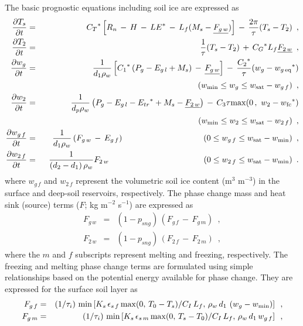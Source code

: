 The basic prognostic equations
including soil ice are expressed as
%
\begin{eqnarray}
\frac{\partial T_s}{\partial t} &=&
{C_T}^\ast \left[ R_n \,-\, H \,-\, {LE}^\ast \,-\,
L_f(M_s-{\underline{F_{g\,w}}})\right] \,-\,
\frac{2\pi}{\tau}(T_s-T_2)
\,\,\,, \\
%
\frac{\partial T_2}{\partial t} &=&
\frac{1}{\tau}(T_s-T_2)
\,+\,{C_G}^\ast L_f {\underline{F_{2\,w}}}
\,\,\,, \\
%
\frac{\partial w_g}{\partial t} &=&
\frac{1}{ d_1\rho_w} \left[ {C_1}^\ast\left(P_g-E_{g\,l}+M_s \right)
\,-\, {\underline{F_{g\,w}}} \right]
\,-\, \frac{{C_2}^\ast}{\tau}(w_g-{w_{g\,{\rm eq}}}^\ast) \\
& & \hskip2.6in
(w_{{\rm min}} \leq w_g \leq w_{\rm sat}-w_{g\,f})
\,\,\,, \\
%
\frac{\partial w_2}{\partial t} &=&
\frac{1}{ d_p\rho_w}
\left(P_g-{E_{g\,l}}-{E_{tr}}^\ast+M_s-
{\underline{F_{2\,w}}} \right) \,-\,{C_3}{\tau}{\rm max}
(0\,,\,\,w_2-{w_{\rm fc}}^\ast) \\
& & \hskip2.6in
(w_{{\rm min}}\leq w_2 \leq w_{\rm sat}-w_{2\,f})
\,\,\,, \\
%
\frac{\partial w_{g\,f}}{\partial t} &=&
\frac{1}{ d_1 \rho_w} \left(
F_{g\,w} \,-\, E_{g\,f} \right)
\hskip1.35in
(0 \leq w_{g\,f}\leq w_{\rm sat}-w_{{\rm min}} )
\,\,\,, \\
%
\frac{\partial w_{2\,f}}{\partial t} &=&
\frac{1}{ \left(d_2-d_1\right)\rho_w} F_{2\,w}
\hskip1.6in
(0 \leq w_{2\,f}\leq w_{\rm sat}-w_{{\rm min}} )
\,\,\,.
\end{eqnarray}
%
where $w_{g\,f}$ and $w_{2\,f}$ represent the volumetric soil ice content
(m$^3$ m$^{-3}$) in the surface and deep-soil reservoirs, respectively.
The phase change mass and heat sink (source) terms ($F$; kg m$^{-2}$ s$^{-1}$)
are expressed as
%
\begin{eqnarray}
F_{g\,w} &=& \left(1-p_{sng}\right)\,\left( F_{g\,f}
\,-\, F_{g\,m}\right)\,\,\,, \\
%
F_{2\,w} &=& \left(1-p_{sng}\right)\,\left( F_{2\,f}
\,-\, F_{2\,m}\right)\,\,\,,
\end{eqnarray}
%
where the $m$ and $f$ subscripts represent melting and
freezing, respectively.
The freezing and melting phase change terms are formulated using simple
relationships based on the potential
energy available for phase change. They are expressed
for the surface soil layer as
%
\begin{eqnarray}
F_{g\,f} &=& \left(1/\tau_i \right)\,{\rm min} \left[
K_s \,\epsilon_{s\,f} \,{\rm max}(0,\,T_0-T_s)/C_I \, L_f ,\,
\rho_w\,d_1\,\left( w_g-w_{\rm min} \right)
\right]
\,\,\, , \\
%
F_{g\,m} &=& \left(1/\tau_i \right)\,{\rm min} \left[
K_s \,\epsilon_{s\,m} \,{\rm max}(0,\,T_s-T_0)/C_I \, L_f ,\,
\rho_w\,d_1\,w_{g\,f}
\right]
\,\,\, ,
\end{eqnarray}
